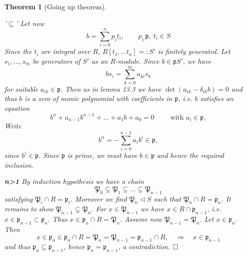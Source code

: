 \documentclass[11pt]{book}
\newtheorem{theorem}{Theorem}[section]
\theoremstyle{nonumberbreak}
\newenvironment{pr}[1][]{\ifthenelse{\equal{#1}{}}{\proof}{\proof[#1]}\rm}{\endproof}
\begin{document}
\begin{spacing}{1.3}
\begin{theorem}[Going up theorem]
\begin{pr}
\begin{compactitem}
\begin{compactenum}
\begin{compactitem}
\item['$\subseteq$'] Let now
$$b=\sum_{i=0}^n p_i t_i, \qquad p_ \in \mathfrak{p}, \ t_i \in S$$
Since the $t_i$ are integral over $R$, $R[t_1, \ldots t_n]=:S'$ is finitely generated. Let $s_1, \ldots, s_m$ be generators of $S'$ as an $R$-module. Since $b \in \mathfrak{p}S'$, we have
$$bs_i=\sum_{k=0}^m a_{ki}s_k$$
for suitable $a_{ik} \in \mathfrak{p}$. Then as in lemma 13.3 we have $\det(a_{ik}-\delta_{ik}b)=0$ and thus $b$ is a zero of monic polynomial with coefficients in $\mathfrak{p}$, i.e. $b$ satisfies an equation 
$$b^n+a_{n-1}b^{n-1} + \ldots + a_1b+a_0=0 \qquad \textrm{ with } a_i \in \mathfrak{p},$$
Write
$$b^n=-\sum_{i=0}^{n-1} a_i b^{i} \in \mathfrak{p},$$
since $b^{i} \in \mathfrak{p}$. Since $\mathfrak{p}$ is prime, we must have $b \in \mathfrak{p}$ and hence the required inclusion.\\
\end{compactitem}
\end{compactenum}
\item[\textbf{n>1}] By induction hypothesis we have a chain
$$\mathfrak{P}_0 \subsetneq \mathfrak{P}_1 \subsetneq \ldots \subsetneq \mathfrak{P}_{n-1}$$
satisfying $\mathfrak{P}_i \cap R = \mathfrak{p}_i$. Moreover we find $\mathfrak{P}_n \triangleleft S$ such that $\mathfrak{P}_n \cap R=\mathfrak{p}_n$. It remains to show $\mathfrak{P}_{n-1} \subsetneq \mathfrak{P}_n$.
For $x \in \mathfrak{P}_{n-1}$ we have $x \in R \cap \mathfrak{p}_{n-1}$, i.e. $x \in \mathfrak{p}_{n-1}\subset \mathfrak{p}_n$. Thus $x \in \mathfrak{p}_{n} \cap R = \mathfrak{P}_n$. Assume now $\mathfrak{P}_{n-1}=\mathfrak{P}_{n}$. Let $x\in \mathfrak{p}_{n}$. Then $$x \in \mathfrak{p}_n \in \mathfrak{p}_n\cap R=\mathfrak{P}_n=\mathfrak{P}_{n-1}=\mathfrak{p}_{n-1} \cap R, \quad \Longrightarrow \quad x \in \mathfrak{p}_{n-1}$$
and thus $\mathfrak{p}_n \subseteq \mathfrak{p}_{n-1}$, hence $\mathfrak{p}_n=\mathfrak{p}_{n-1}$, a contradiction. $\hfill \Box$
\end{compactitem}
\end{pr}
\end{theorem}


\end{spacing}
\end{document}
